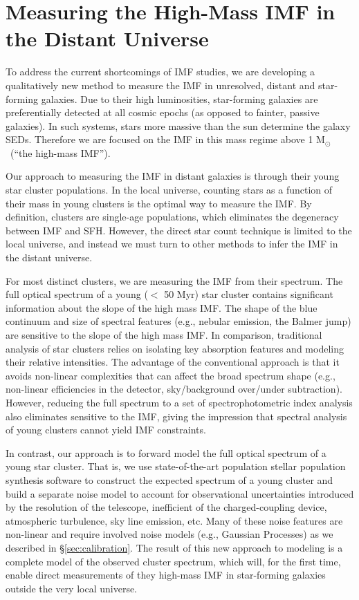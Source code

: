\documentclass[11pt,preprint]{aastex}
\providecommand{\msun}{M$_\odot$~}
\begin{document}
\section{Measuring the High-Mass IMF in the Distant Universe}

To address the current shortcomings of IMF studies, we are developing a qualitatively new method to measure the IMF in unresolved, distant and star-forming galaxies.  Due to their high luminosities, star-forming galaxies are preferentially detected at all cosmic epochs (as opposed to fainter, passive galaxies).  In such systems, stars more massive than the sun determine the galaxy SEDs. Therefore we are focused on the IMF in this mass regime above 1 \msun (``the high-mass IMF'').

Our approach to measuring the IMF in distant galaxies is through their young star cluster populations. In the local universe, counting stars as a function of their mass in young clusters is the optimal way to measure the IMF.  By definition, clusters are single-age populations, which eliminates the degeneracy between IMF and SFH.  However, the direct star count technique is limited to the local universe, and instead we must turn to other methods to infer the IMF in the distant universe.  

For most distinct clusters, we are measuring the IMF from their spectrum.  The full optical spectrum of a young ($<$ 50 Myr) star cluster contains significant information about the slope of the high mass IMF.  The shape of the blue continuum and size of spectral features (e.g., nebular emission, the Balmer jump) are sensitive to the slope of the high mass IMF.  In comparison, traditional analysis of star clusters relies on isolating key absorption features and modeling their relative intensities.  The advantage of the conventional approach is that it avoids non-linear complexities that can affect the broad spectrum shape (e.g., non-linear efficiencies in the detector,  sky/background over/under subtraction).  However, reducing the full spectrum to a set of spectrophotometric index analysis also eliminates sensitive to the IMF\citep[e.g.,][]{koleva2008}, giving the impression that spectral analysis of young clusters cannot yield IMF constraints. 

In contrast, our approach is to forward model the full optical spectrum of a young star cluster.  That is, we use state-of-the-art population stellar population synthesis software to construct the expected spectrum of a young cluster and build a separate noise model to account for observational uncertainties introduced by the resolution of the telescope, inefficient of the charged-coupling device, atmospheric turbulence, sky line emission, etc.  Many of these noise features are non-linear and require involved noise models (e.g., Gaussian Processes) as we described in \S \ref{sec:calibration}.  The result of this new approach to modeling is a complete model of the observed cluster spectrum, which will, for the first time, enable direct measurements of they high-mass IMF in star-forming galaxies outside the very local universe.  
\end{document}
